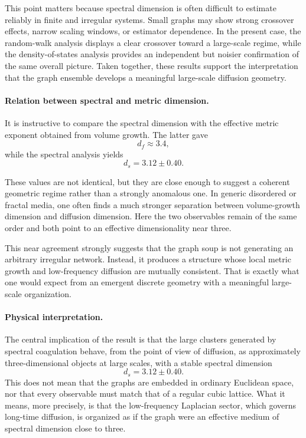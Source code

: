 \documentclass[11pt]{article}
\begin{document}
This point matters because spectral dimension is often difficult to estimate reliably in finite and irregular systems.
Small graphs may show strong crossover effects, narrow scaling windows, or estimator dependence.
In the present case, the random-walk analysis displays a clear crossover toward a large-scale regime, while the density-of-states analysis provides an independent but noisier confirmation of the same overall picture.
Taken together, these results support the interpretation that the graph ensemble develops a meaningful large-scale diffusion geometry.

\paragraph{Relation between spectral and metric dimension.}

It is instructive to compare the spectral dimension with the effective metric exponent obtained from volume growth.
The latter gave
\[
d_f \approx 3.4,
\]
while the spectral analysis yields
\[
d_s = 3.12 \pm 0.40.
\]

These values are not identical, but they are close enough to suggest a coherent geometric regime rather than a strongly anomalous one.
In generic disordered or fractal media, one often finds a much stronger separation between volume-growth dimension and diffusion dimension.
Here the two observables remain of the same order and both point to an effective dimensionality near three.

This near agreement strongly suggests that the graph soup is not generating an arbitrary irregular network.
Instead, it produces a structure whose local metric growth and low-frequency diffusion are mutually consistent.
That is exactly what one would expect from an emergent discrete geometry with a meaningful large-scale organization.

\paragraph{Physical interpretation.}

The central implication of the result is that the large clusters generated by spectral coagulation behave, from the point of view of diffusion, as approximately three-dimensional objects at large scales, with a stable spectral dimension
\[
d_s = 3.12 \pm 0.40.
\]
This does not mean that the graphs are embedded in ordinary Euclidean space, nor that every observable must match that of a regular cubic lattice.
What it means, more precisely, is that the low-frequency Laplacian sector, which governs long-time diffusion, is organized as if the graph were an effective medium of spectral dimension close to three.
\end{document}
